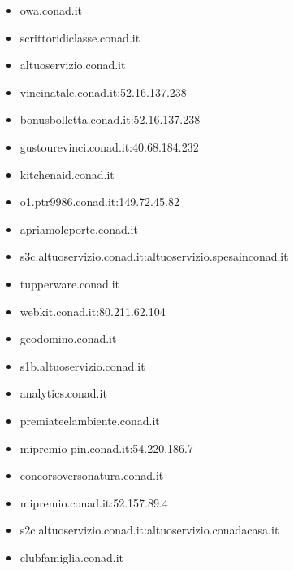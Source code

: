 \documentclass{article}
\begin{document}
\begin{itemize}
        \item owa.conad.it
    
        \item scrittoridiclasse.conad.it
    
        \item altuoservizio.conad.it
    
        \item vincinatale.conad.it:52.16.137.238
    
        \item bonusbolletta.conad.it:52.16.137.238
    
        \item gustourevinci.conad.it:40.68.184.232
    
        \item kitchenaid.conad.it
    
        \item o1.ptr9986.conad.it:149.72.45.82
    
        \item apriamoleporte.conad.it
    
        \item s3c.altuoservizio.conad.it:altuoservizio.spesainconad.it
    
        \item tupperware.conad.it
    
        \item webkit.conad.it:80.211.62.104
    
        \item geodomino.conad.it
    
        \item s1b.altuoservizio.conad.it
    
        \item analytics.conad.it
    
        \item premiateelambiente.conad.it
    
        \item mipremio-pin.conad.it:54.220.186.7
    
        \item concorsoversonatura.conad.it
    
        \item mipremio.conad.it:52.157.89.4
    
        \item s2c.altuoservizio.conad.it:altuoservizio.conadacasa.it
    
        \item clubfamiglia.conad.it
    

\end{itemize}
\end{document}

